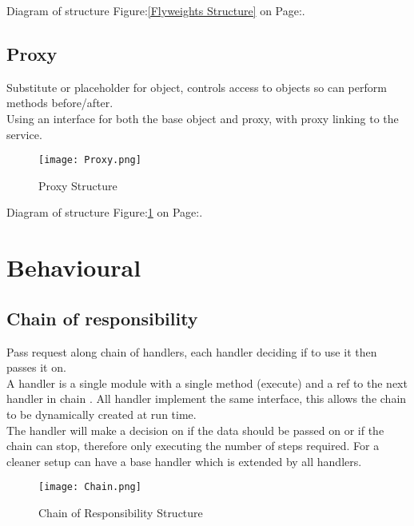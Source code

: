 \documentclass[11pt]{scrartcl} %
\begin{document}
Diagram of structure Figure:\ref{Flyweights Structure} on Page:\pageref{Flyweights Structure}.

\subsection{Proxy}

Substitute or placeholder for object, controls access to objects so can perform methods before/after.\\

Using an interface for both the base object and proxy, with proxy linking to the service.\\

\begin{figure}[h] %
	\centering
	\texttt{[image: Proxy.png]} %
	\caption{Proxy Structure}
	\label{Proxy Structure}
\end{figure}

Diagram of structure Figure:\ref{Proxy Structure} on Page:\pageref{Proxy Structure}.

\section{Behavioural}

\subsection{Chain of responsibility}

Pass request along chain of handlers, each handler deciding if to use it then passes it on.\\

A handler is a single module with a single method (execute) and a ref to the next handler in chain
. All handler implement the same interface, this allows the chain to be dynamically created at
run time.\\

The handler will make a decision on if the data should be passed on or if the chain can stop,
therefore only executing the number of steps required. For a cleaner setup can have a base handler
which is extended by all handlers.\\

\begin{figure}[h] %
	\centering
	\texttt{[image: Chain.png]} %
	\caption{Chain of Responsibility Structure}
	\label{Chain of Responsibility Structure}
\end{figure}
\end{document}
